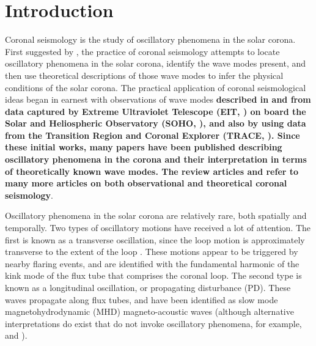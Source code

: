 \documentclass[preprint]{aastex}
\begin{document}
\section{Introduction}\label{sec:int}
Coronal seismology is the study of oscillatory phenomena in the solar
corona.  First suggested by \cite{1970PASJ...22..341U}, the practice
of coronal seismology attempts to locate oscillatory phenomena in the
solar corona, identify the wave modes present, and then use
theoretical descriptions of those wave modes to infer the physical
conditions of the solar corona.  The practical application of coronal
seismological ideas began in earnest with observations of wave modes
{\bf described in \cite{1998ApJ...501L.217D} and
  \cite{1999SoPh..186..207B} from data captured by Extreme Ultraviolet
  Telescope (EIT, \citealp{1995SoPh..162..291D}) on board the Solar and Heliospheric
  Observatory (SOHO, \citealp{1995SoPh..162....1D}), and also by
  \citep{1999ApJ...520..880A} using data from the Transition Region
  and Coronal Explorer (TRACE, \citealp{1999SoPh..187..229H}).  Since these initial works,
  many papers have been published describing oscillatory phenomena in
  the corona and their interpretation in terms of theoretically known
  wave modes.  The review articles \cite{lrsp-2005-3} and
  \cite{2012RSPTA.370.3193D} refer to many more articles on both
  observational and theoretical coronal seismology}.

Oscillatory phenomena in the solar corona are relatively rare, both
spatially and temporally.  Two types of oscillatory motions have
received a lot of attention.  The first is known as a transverse
oscillation, since the loop motion is approximately transverse to the
extent of the loop \citep{1999Sci...285..862N}.  These motions appear
to be triggered by nearby flaring events, and are identified with the
fundamental harmonic of the kink mode of the flux tube that comprises
the coronal loop.  The second type is known as a longitudinal
oscillation, or propagating disturbance (PD).  These waves propagate
along flux tubes, and have been identified as slow mode
magnetohydrodynamic (MHD) magneto-acoustic waves (although alternative
interpretations do exist that do not invoke oscillatory phenomena, for
example, \cite{0004-637X-722-2-1013} and \cite{2041-8205-727-2-L37}).
\end{document}
